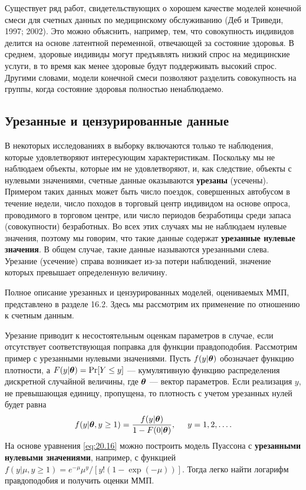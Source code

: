 Существует ряд работ, свидетельствующих о хорошем качестве моделей конечной смеси для счетных данных по медицинскому обслуживанию (Деб и Триведи, 1997; 2002). Это можно объяснить, например, тем, что совокупность индивидов делится на основе латентной переменной, отвечающей за состояние здоровья. В среднем, здоровые индивиды могут предъявлять низкий спрос на медицинские услуги, в то время как менее здоровые будут поддерживать высокий спрос. Другими словами, модели конечной смеси позволяют разделить совокупность на группы, когда состояние здоровья полностью ненаблюдаемо.


\subsection{Урезанные и цензурированные данные}\label{sec:20.4.4}

\noindent
В некоторых исследованиях в выборку включаются только те наблюдения, которые удовлетворяют интересующим характеристикам. Поскольку мы не наблюдаем объекты, которые им не удовлетворяют, и, как следствие, объекты с нулевыми значениями, счетные данные оказываются \textbf{урезаны} (усечены). Примером таких данных может быть число поездок, совершенных автобусом в течение недели, число походов в торговый центр индивидом на основе опроса, проводимого в торговом центре, или число периодов безработицы среди запаса (совокупности) безработных. Во всех этих случаях мы не наблюдаем нулевые значения, поэтому мы говорим, что такие данные содержат \textbf{урезанные нулевые значения}. В общем случае, такие данные называются урезанными слева. Урезание (усечение) справа возникает из-за потери наблюдений, значение которых превышает определенную величину.

Полное описание урезанных и цензурированных моделей, оцениваемых ММП, представлено в разделе 16.2. Здесь мы рассмотрим их применение по отношению к счетным данным.

Урезание приводит к несостоятельным оценкам параметров в случае, если отсутствует соответствующая поправка для функции правдоподобия. Рассмотрим пример с урезанными нулевыми значениями. Пусть $f(y|\bm{\theta})$ обозначает функцию плотности, а $F(y|\bm{\theta}) = \mathrm{Pr}[Y \le y]$ --- кумулятивную функцию распределения дискретной случайной величины, где $\bm{\theta}$ --- вектор параметров. Если реализация $y$, не превышающая единицу, пропущена, то плотность с учетом урезанных нулей будет равна
    \begin{align}\label{eq:20.16}
    f(y|\bm{\theta}, y \ge 1) = \frac{f(y|\bm{\theta})}{1 - F(0|\bm{\theta})}, \hspace{0.5cm} y = 1, 2, \ldots  .
    \end{align}
На основе уравнения \ref{eq:20.16} можно построить модель Пуассона с \textbf{урезанными нулевыми значениями}, например, с функцией $f(y|\mu, y \ge 1) = e^{-\mu}\mu^y / [y!(1 - \exp(-\mu))]$. Тогда легко найти логарифм правдоподобия и получить оценки ММП.

